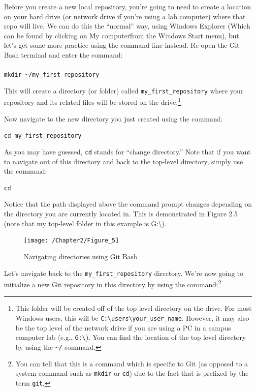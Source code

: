 \documentclass{book}
\begin{document}
Before you create a new local repository, you're going to need to create a location on your hard drive (or network drive if you're using a lab computer) where that repo will live. We can do this the ``normal'' way, using Windows Explorer (Which can be found by clicking on \"My computer\" from the Windows Start menu), but let's get some more practice using the command line instead.  Re-open the Git Bash terminal and enter the command: \\ \\ \texttt{mkdir \textasciitilde/my\_first\_repository}
 
This will create a directory (or folder) called \texttt{my\_first\_repository} where your repository and its related files will be stored on the drive.\footnote{This folder will be created off of the top level directory on the drive. For most Windows users, this will be \texttt{C:\textbackslash users\textbackslash your\_user\_name}. However, it may also be the top level of the network drive if you are using a PC in a campus computer lab (e.g., \texttt{G:\textbackslash}). You can find the location of the top level directory by using the \texttt{\textasciitilde/} command.}

Now navigate to the new directory you just created using the command:

\texttt{cd my\_first\_repository}

As you may have guessed, \texttt{cd} stands for ``change directory.'' Note that if you want to navigate out of this directory and back to the top-level directory, simply use the command:

\texttt{cd}

Notice that the path displayed above the command prompt changes depending on the directory you are currently located in. This is demonstrated in Figure 2.5 (note that my top-level folder in this example is G:\textbackslash).

\begin{figure}[h]
	\caption{Navigating directories using Git Bash}
	\centering\texttt{[image: /Chapter2/Figure\_5]}
\end{figure}

Let's navigate back to the \texttt{my\_first\_repository} directory. We're now going to initialize a new Git repository in this directory by using the command:{\footnote {You can tell that this is a command which is specific to Git (as opposed to a system command such as \texttt{mkdir} or \texttt{cd}) due to the fact that is prefixed by the term \texttt{git}.}} 
\end{document}
